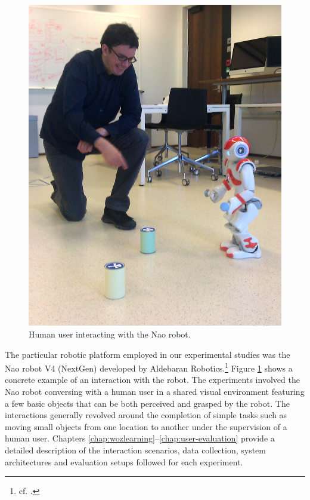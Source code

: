 \begin{figure}
\vspace{-2mm}
\centering 
\includegraphics[scale=0.1]{imgs/nao1.jpg}
\caption{Human user interacting with the Nao robot.}
\label{fig:nao}
\end{figure}

The particular robotic platform employed in our experimental studies was the Nao robot V4 (NextGen) developed by 
 Aldebaran Robotics.\footnote{cf.  .}  Figure \ref{fig:nao} shows a concrete example of an interaction with the robot. The experiments involved the Nao robot conversing with a human user in a shared visual environment featuring a few basic objects that can be both perceived and grasped by the robot.  The interactions generally revolved around the completion of simple tasks such as moving small objects from one location to another under the supervision of a human user. Chapters \ref{chap:wozlearning}--\ref{chap:user-evaluation} provide a detailed description of the interaction scenarios, data collection, system architectures and evaluation setups followed for each experiment. 

